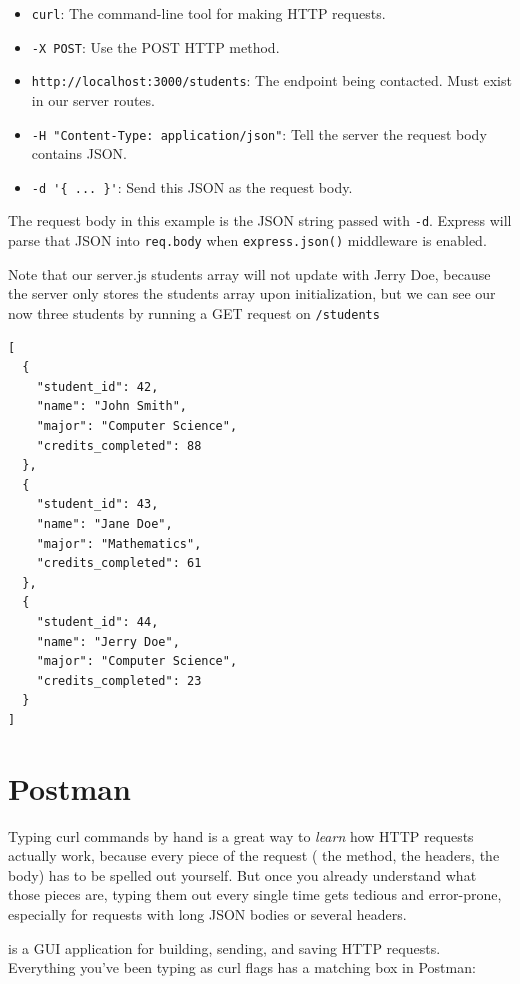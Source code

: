 \begin{itemize}
  \item \texttt{curl}: The command-line tool for making HTTP requests.
  \item \texttt{-X POST}: Use the POST HTTP method.
  \item \texttt{http://localhost:3000/students}: The endpoint being contacted. Must exist in our server routes.
  \item \texttt{-H "Content-Type: application/json"}: Tell the server the request body contains JSON.
  \item \verb|-d '{ ... }'|: Send this JSON as the request body.
\end{itemize}

The request body in this example is the JSON string passed with \texttt{-d}. Express will parse that JSON into \texttt{req.body} when \texttt{express.json()} middleware is enabled.

Note that our server.js students array will not update with Jerry Doe, because the server only stores the students array upon initialization, but we can see our now three students by running a GET request on \texttt{/students}

\begin{verbatim}
[
  {
    "student_id": 42,
    "name": "John Smith",
    "major": "Computer Science",
    "credits_completed": 88
  },
  {
    "student_id": 43,
    "name": "Jane Doe",
    "major": "Mathematics",
    "credits_completed": 61
  },
  {
    "student_id": 44,
    "name": "Jerry Doe",
    "major": "Computer Science",
    "credits_completed": 23
  }
]
\end{verbatim}


\section{Postman}
 
Typing curl commands by hand is a great way to \emph{learn} how HTTP
requests actually work, because every piece of the request (
the method, the headers, the body) has to be spelled out yourself.
But once you already understand what those pieces are, typing them out
every single time gets tedious and error-prone, especially for requests
with long JSON bodies or several headers.
 
 is a GUI application for building, sending, and
saving HTTP requests. Everything you've been typing as curl flags has
a matching box in Postman:
 
